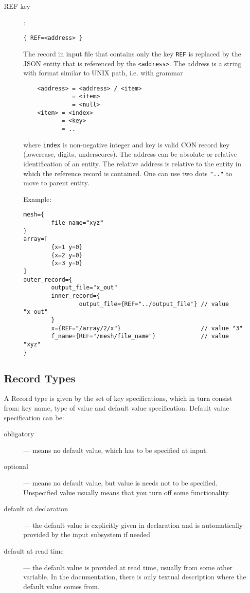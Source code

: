 \begin{description}



\item[REF key]:
\begin{verbatim}
{ REF=<address> }
\end{verbatim}
The record in input file that contains only the key \verb'REF' is replaced by the JSON entity that is referenced by the \verb'<address>'. 
The address is a string with format similar to UNIX path, i.e. with grammar
\begin{verbatim}
    <address> = <address> / <item>
              = <item>  
              = <null>
    <item> = <index>
           = <key>
           = ..
\end{verbatim}
where \verb'index' is non-negative integer and key is valid CON record key (lowercase, digits, underscores).
The address can be absolute or relative identification of an entity. The relative address is relative to the entity in which the reference record is contained.
One can use two dots \verb'".."' to move to parent entity.

Example:
\begin{verbatim}
mesh={
        file_name="xyz"
}
array=[
        {x=1 y=0}       
        {x=2 y=0}
        {x=3 y=0}
]               
outer_record={
        output_file="x_out"
        inner_record={
                output_file={REF="../output_file"} // value "x_out"
        }
        x={REF="/array/2/x"}                       // value "3"
        f_name={REF="/mesh/file_name"}             // value "xyz"
}       
\end{verbatim}
\end{description}

\subsection{Record Types}
A Record type is given by the set of key specifications, which in turn consist from: key name, type of value and default value specification.
Default value specification can be:
\begin{description} 
 \item[obligatory] --- means no default value, which has to be specified at input. 
 \item[optional] --- means no default value, but value is needs not to be specified. Unspecified value usually means that you turn off some functionality.
 \item[default at declaration] --- the default value is explicitly given in declaration and is automatically provided by the input subsystem if needed
 \item[default at read time] --- the default value is provided at read time, usually from some other variable. In the documentation, 
 there is only textual description where the default value comes from.
\end{description}

